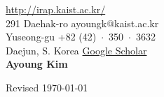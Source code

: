 \documentclass{cv} %
\newcommand\koronly[1]{\ifthenelse{\boolean{kor}}{#1}}
\begin{document}
 \hfill \href{http://irap.kaist.ac.kr/}{http://irap.kaist.ac.kr/}\\
291 Daehak-ro \hfill ayoungk@kaist.ac.kr\\
Yuseong-gu \hfill +82 (42)~$\cdot$~350~$\cdot$~3632\\
Daejun, S. Korea \hfill \href{https://scholar.google.com/citations?user=7yveufgAAAAJ&hl=en}{Google Scholar}\\

\hfil{\namesize\bf Ayoung Kim}\hfil

%





\koronly{}


%
%

\newpage 

%
%



\vspace{0.5in}
\hfill Revised \today
\end{document}
